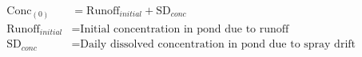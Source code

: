 \documentclass[fleqn, oneside, 11pt]{article}%
\begin{document}
\begin{preview}
\begin{align*}%
\text{Conc}_{(0)} & = \text{Runoff}_{initial} + \text{SD}_{conc} \nonumber \\
\text{Runoff}_{initial} & = \text{Initial concentration in pond due to runoff} \nonumber \\
\text{SD}_{conc} & = \text{Daily dissolved concentration in pond due to spray drift } \nonumber \\
\end{align*} 
\end{preview}
\end{document}
